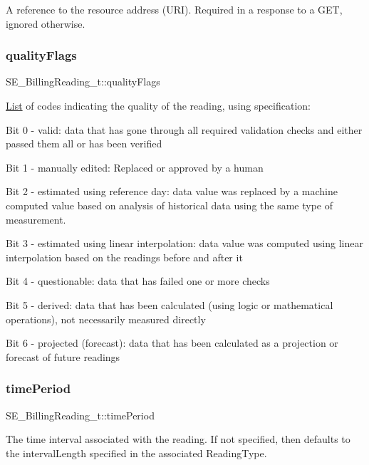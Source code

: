 A reference to the resource address (U\+RI). Required in a response to a G\+ET, ignored otherwise. \mbox{\label{group__BillingReading_ga2d2f8b1f807f992cd505186820b6cea2}} 
\subsubsection{\texorpdfstring{quality\+Flags}{qualityFlags}}
{\footnotesize\ttfamily S\+E\+\_\+\+Billing\+Reading\+\_\+t\+::quality\+Flags}

\hyperlink{structList}{List} of codes indicating the quality of the reading, using specification\+:

Bit 0 -\/ valid\+: data that has gone through all required validation checks and either passed them all or has been verified

Bit 1 -\/ manually edited\+: Replaced or approved by a human

Bit 2 -\/ estimated using reference day\+: data value was replaced by a machine computed value based on analysis of historical data using the same type of measurement.

Bit 3 -\/ estimated using linear interpolation\+: data value was computed using linear interpolation based on the readings before and after it

Bit 4 -\/ questionable\+: data that has failed one or more checks

Bit 5 -\/ derived\+: data that has been calculated (using logic or mathematical operations), not necessarily measured directly

Bit 6 -\/ projected (forecast)\+: data that has been calculated as a projection or forecast of future readings \mbox{\label{group__BillingReading_gaf005e1ec874e2c47b377b1920e8dabba}} 
\subsubsection{\texorpdfstring{time\+Period}{timePeriod}}
{\footnotesize\ttfamily S\+E\+\_\+\+Billing\+Reading\+\_\+t\+::time\+Period}

The time interval associated with the reading. If not specified, then defaults to the interval\+Length specified in the associated Reading\+Type. \mbox{\label{group__BillingReading_gad7e3baa3bf7a76797bb28792a2a02dd8}} 
